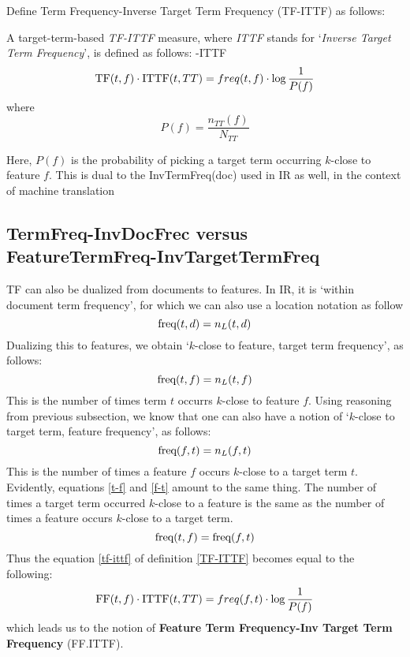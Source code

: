 Define Term Frequency-Inverse Target Term Frequency (TF-ITTF) as follows:

\begin{definition}
\label{TF-ITTF}
A target-term-based  \emph{TF-ITTF}  measure, where \emph{ITTF} stands for `\emph{Inverse Target Term Frequency}', is defined as follows:
\TF-\textmd{ITTF}
\begin{equation}
\label{tf-ittf}
\textmd{TF}(t,f) \cdot \textmd{ITTF}(t, TT) = freq(t, f) \cdot \log{\frac{1}{P(f)}}
\end{equation}
where
\[
P(f) =  \frac{n_{TT}(f)}{N_{TT}}
\]
\end{definition}
Here, $P(f)$ is the  probability of picking a target term  occurring $k$-close to feature $f$.  This is dual to the InvTermFreq(doc)
used in IR as well, in the context of machine translation



\subsection{TermFreq-InvDocFrec versus FeatureTermFreq-InvTargetTermFreq}

TF can also be dualized from documents to features. In IR, it is `within document term frequency', for which we can also use a location notation as follow
\[
\textmd{freq}(t,d) = n_L(t,d)
\]
Dualizing this to features, we obtain `$k$-close to feature, target  term frequency', as follows:
\begin{equation}
\label{t-f}
\textmd{freq}(t,f) = n_L(t,f)
\end{equation}
This is the number of times term $t$ occurrs $k$-close to feature $f$.  Using reasoning from previous subsection, we know that one can also have a notion of `$k$-close to target term, feature frequency', as follows:
\begin{equation}
\label{f-t}
\textmd{freq}(f,t) = n_L(f,t)
\end{equation}
This is the number of times a feature $f$ occurs $k$-close to a target term $t$.  Evidently, equations \ref{t-f} and \ref{f-t} amount to the same thing. The number of times a target term occurred $k$-close to a feature is the same as the number of times a feature occurs $k$-close to a target term. 
\[
\textmd{freq}(t,f) = \textmd{freq}(f,t) 
\]
Thus the equation \ref{tf-ittf} of definition \ref{TF-ITTF} becomes equal to the following: 
\begin{equation}
\label{ff-ittf}
\textmd{FF}(t,f) \cdot \textmd{ITTF}(t, TT) =  freq(f, t) \cdot \log{\frac{1}{P(f)}}
\end{equation}
which leads us to  the notion of  {\bf Feature Term Frequency-Inv Target Term Frequency} (FF.ITTF).

